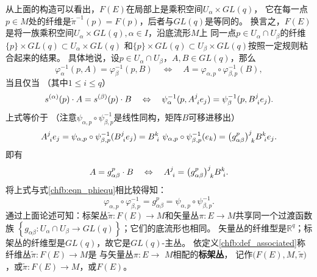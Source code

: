 从上面的构造可以看出，$F(E)$在局部上是乘积空间$U_{\alpha} \times GL(q)$，
它在每一点$p \in M$处的纤维是$\tilde{\pi}^{-1}(p)=F(p)$，后者与$GL(q)$是等同的。
换言之，$F(E)$是将一族乘积空间$U_{\alpha} \times GL(q), \alpha \in I$，沿底流形$M$上
同一点$p \in U_{\alpha} \cap U_{\beta}$的纤维$\{p\} \times GL(q) \subset U_{\alpha} \times GL(q)$
和$\{p\} \times GL(q) \subset U_{\beta} \times GL(q)$按照一定规则粘合起来的结果。
具体地说，设$p \in U_{\alpha} \cap U_{\beta}$，$ A, B \in GL(q)$，那么 
\begin{equation}\label{chfb:eqn_phiequ}
    \varphi_{\alpha}^{-1}(p, A)=\varphi_{\beta}^{-1}(p, B) 
    \quad \Leftrightarrow \quad
    A=\varphi_{\alpha, p} \circ \varphi_{\beta, p}^{-1}(B) ,
\end{equation}
当且仅当 （其中$1 \leqslant i \leqslant q $）
\begin{equation}\label{chfb:eqn_sasb}
    s^{(\alpha)}(p) \cdot A=s^{(\beta)}(p) \cdot B 
    \quad \Leftrightarrow \quad
    \psi_{\alpha}^{-1}(p, A_{\hphantom{i}i}^{j} e_{j})
    =\psi_{\beta}^{-1}(p, B_{\hphantom{i}i}^{j} e_{j}).
\end{equation}
上式等价于 （注意$\psi_{\alpha, p} \circ \psi_{\beta, p}^{-1}$是线性同构，矩阵$B$可移进移出）
\begin{equation}
    A_{\hphantom{i}i}^{j} e_{j}=\psi_{\alpha, p} \circ \psi_{\beta, p}^{-1}(B_{\hphantom{i}i}^{j}e_{j})
    =B_{\hphantom{i}i}^{k}\ \psi_{\alpha, p} \circ \psi_{\beta, p}^{-1}(e_{k})
    =\bigl(g_{\alpha \beta}^p\bigr)_{\hphantom{i}k}^{j} B_{\hphantom{i}i}^{k} e_{j} .
\end{equation}
即有 
\begin{equation}\label{chfb:eqn_agb}
    A=g_{\alpha \beta}^p \cdot B \quad \Leftrightarrow \quad
    A_{\hphantom{i}i}^{j}  = \bigl(g_{\alpha \beta}^p\bigr)_{\hphantom{i}k}^{j} B_{\hphantom{i}i}^{k}.
\end{equation}
将上式与式\eqref{chfb:eqn_phiequ}相比较得知：
\begin{equation}\label{chfb:eqn_pgp}
    \varphi_{\alpha, p} \circ \varphi_{\beta, p}^{-1}=g_{\alpha \beta}^p
    =\psi_{\alpha, p} \circ \psi_{\beta, p}^{-1}.
\end{equation}
通过上面论述可知：标架丛$\tilde{\pi}: F(E) \rightarrow M$和矢量丛$\pi: E \rightarrow M$共享同一个过渡函数族
$\left\{g_{\alpha \beta}: U_{\alpha} \cap U_{\beta} \rightarrow GL(q)\right\}$；它们的底流形也相同。
矢量丛的纤维型是$\mathbb{R}^q$；标架丛的纤维型是$GL(q)$，故它是$GL(q)$-主丛。
依定义\ref{chfb:def_associated}称纤维丛$\tilde{\pi}: F(E) \rightarrow M$是
与矢量丛$\pi: E \rightarrow$ $M$相配的\textbf{标架丛}，
记作$\bigl(F(E), M, \tilde{\pi}\bigr)$，或$\tilde{\pi}: F(E) \rightarrow M$，或$F(E)$。



